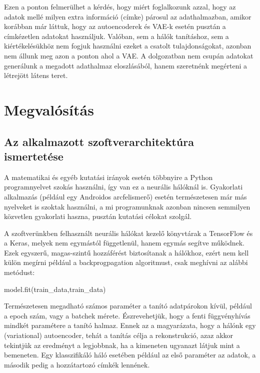 Ezen a ponton felmerülhet a kérdés, hogy miért foglalkozunk azzal, hogy az adatok mellé milyen extra információ (címke) párosul az adathalmazban, amikor korábban már láttuk, hogy az autoencoderek és VAE-k esetén pusztán a címkézetlen adatokat használjuk. Valóban, sem a hálók tanításhoz, sem a kiértékelésükhöz nem fogjuk használni ezeket a csatolt tulajdonságokat, azonban nem állunk meg azon a ponton ahol a VAE. A dolgozatban nem csupán adatokat generálunk a megadott adathalmaz eloszlásából, hanem szeretnénk megérteni a létrejött látens teret.

\chapter{Megvalósítás}

\section{Az alkalmazott szoftverarchitektúra ismertetése}

A matematikai és egyéb kutatási irányok esetén többnyire a Python programnyelvet szokás használni, így van ez a neurális hálóknál is. Gyakorlati alkalmazás (például egy Androidos arcfelismerő) esetén természetesen már más nyelveket is szoktak használni, a mi programunknak azonban nincsen semmilyen közvetlen gyakorlati haszna, pusztán kutatási célokat szolgál.

A szoftverünkben felhasznált neurális hálókat kezelő könyvtárak a TensorFlow és a Keras, melyek nem egymástól függetlenül, hanem egymás segítve működnek. Ezek egyszerű, magas-szintű hozzáférést biztosítanak a hálókhoz, ezért nem kell külön megírni például a backprogpagation algoritmust, csak meghívni az alábbi metódust:

\begin{python}
model.fit(train_data,train_data)
\end{python}

Természetesen megadható számos paraméter a tanító adatpárokon kívül, például a epoch szám, vagy a batchek mérete. Észrevehetjük, hogy a fenti függvényhívás mindkét paramétere a tanító halmaz. Ennek az a magyarázata, hogy a hálónk egy (variational) autoencoder, tehát a tanítás célja a rekonstrukció, azaz akkor tekintjük az eredményt a legjobbnak, ha a kimeneten ugyanazt látjuk mint a bemeneten. Egy klasszifikáló háló esetében például az első paraméter az adatok, a második pedig a hozzátartozó címkék lennének.

